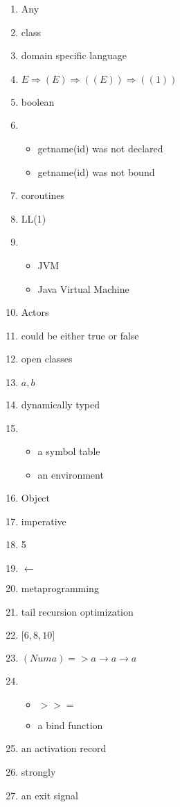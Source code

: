 \documentclass{exam}
\begin{document}
\begin{enumerate}
\item Any
\item class
\item domain specific language
\item $E \Rightarrow (E) \Rightarrow ((E)) \Rightarrow ((1))$
\item boolean
\item \begin{itemize}
\item getname(id) was not declared
\item getname(id) was not bound
\end{itemize}
\item coroutines
\item LL(1)
\item \begin{itemize}
\item JVM
\item Java Virtual Machine
\end{itemize}
\item Actors
\item could be either true or false
\item open classes
\item ${a,b}$
\item dynamically typed
\item \begin{itemize}
\item a symbol table
\item an environment
\end{itemize}
\item Object
\item imperative
\item 5
\item $\leftarrow$
\item metaprogramming
\item tail recursion optimization
\item $\lbrack 6, 8, 10\rbrack$
\item $(Num a) => a \rightarrow a \rightarrow a$
\item \begin{itemize}
\item $>>=$
\item a bind function
\end{itemize}
\item an activation record
\item strongly
\item an exit signal

\end{enumerate}
\end{document}
